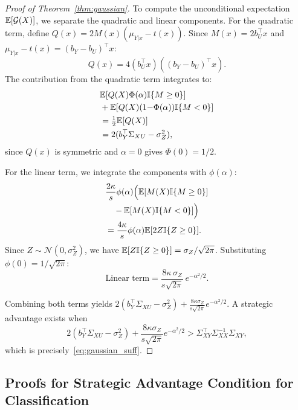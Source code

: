 \begin{proof}[Proof of Theorem~\ref{thm:gaussian}]
To compute the unconditional expectation $\mathbb{E}[\mathcal{G}(X)]$, we separate the quadratic and linear components. For the quadratic term, define $Q(x) = 2M(x)(\mu_{Y|x} - t(x))$. Since $M(x) = 2b_U^\top x$ and $\mu_{Y|x} - t(x) = (b_Y - b_U)^\top x$:
\begin{equation*}
  Q(x) = 4(b_U^\top x)((b_Y - b_U)^\top x).
\end{equation*}
The contribution from the quadratic term integrates to:
\begin{align*}
  &\mathbb{E}[Q(X)\Phi(\alpha)\mathbb{I}\{M \ge 0\}] \\
  &+ \mathbb{E}[Q(X)(1{-}\Phi(\alpha))\mathbb{I}\{M < 0\}] \\
  &= \tfrac{1}{2}\mathbb{E}[Q(X)] \\
  &= 2(b_Y^\top \Sigma_{XU} - \sigma_Z^2),
\end{align*}
since $Q(x)$ is symmetric and $\alpha = 0$ gives $\Phi(0) = 1/2$.

For the linear term, we integrate the components with $\phi(\alpha)$:
\begin{align*}
  &\frac{2\kappa}{s}\phi(\alpha)\Big(\mathbb{E}[M(X)\mathbb{I}\{M \ge 0\}] \\
  &\quad - \mathbb{E}[M(X)\mathbb{I}\{M < 0\}]\Big) \\
  &= \frac{4\kappa}{s}\phi(\alpha)\mathbb{E}[2Z\mathbb{I}\{Z \ge 0\}].
\end{align*}
Since $Z \sim \mathcal{N}(0, \sigma_Z^2)$, we have $\mathbb{E}[Z \mathbb{I}\{Z \ge 0\}] = \sigma_Z / \sqrt{2\pi}$. Substituting $\phi(0) = 1/\sqrt{2\pi}$:
\begin{equation*}
  \text{Linear term} = \frac{8\kappa\,\sigma_Z}{s\sqrt{2\pi}}\, e^{-\alpha^2/2}.
\end{equation*}

Combining both terms yields $2(b_Y^\top \Sigma_{XU} - \sigma_Z^2) + \frac{8\kappa\sigma_Z}{s\sqrt{2\pi}} e^{-\alpha^2/2}$. A strategic advantage exists when 
\begin{equation*}
2(b_Y^\top \Sigma_{XU} - \sigma_Z^2) + \frac{8\kappa\sigma_Z}{s\sqrt{2\pi}} e^{-\alpha^2/2} > \Sigma_{XY}^\top \Sigma_{XX}^{-1}\Sigma_{XY},
\end{equation*}
which is precisely~\eqref{eq:gaussian_suff}.
\end{proof}

\subsection{Proofs for Strategic Advantage Condition for Classification}
\label{app:classification}

